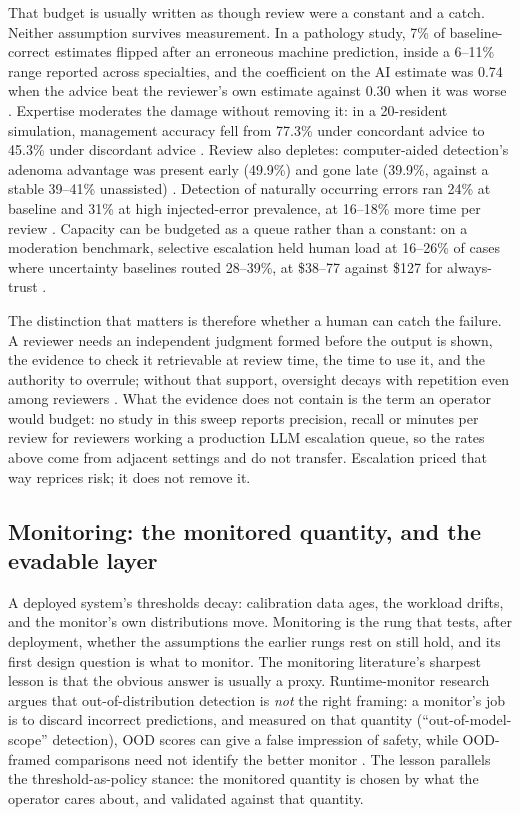 That budget is usually written as though review were a constant and a catch. Neither assumption
survives measurement. In a pathology study, 7\% of baseline-correct estimates flipped after an
erroneous machine prediction, inside a 6--11\% range reported across specialties, and the
coefficient on the AI estimate was 0.74 when the advice beat the reviewer's own estimate against
0.30 when it was worse \cite{rosbach2026stuck} \evindep{}. Expertise moderates the damage without
removing it: in a 20-resident simulation, management accuracy fell from 77.3\% under concordant
advice to 45.3\% under discordant advice \cite{atman2026llm} \evindep{}. Review also depletes: computer-aided
detection's adenoma advantage was present early (49.9\%) and gone late (39.9\%, against a stable
39--41\% unassisted) \cite{huang2026cade} \evindep{}. Detection of naturally occurring errors ran
24\% at baseline and 31\% at high injected-error prevalence, at 16--18\% more time per review
\cite{fang2026right} \evindep{}. Capacity can be budgeted as a queue rather than a
constant: on a moderation benchmark, selective escalation held human load at 16--26\% of cases
where uncertainty baselines routed 28--39\%, at \$38--77 against \$127 for always-trust
\cite{bachar2026lpp} \evaurep{}.

The distinction that matters is therefore whether a human can catch the failure. A reviewer
needs an independent judgment formed before the output is shown, the evidence to check it
retrievable at review time, the time to use it, and the authority to overrule; without that
support, oversight decays with repetition even among reviewers \cite{fu2026knowing} \evindep{}.
What the evidence does not contain is the term an operator would budget: no study in this sweep
reports precision, recall or minutes per review for reviewers working a production LLM
escalation queue, so the rates above come from adjacent settings and do not transfer. Escalation
priced that way reprices risk; it does not remove it.

\subsection{Monitoring: the monitored quantity, and the evadable layer}
\label{sec:l5-monitoring}

A deployed system's thresholds decay: calibration data ages, the workload drifts, and the
monitor's own distributions move. Monitoring is the rung that tests, after deployment, whether
the assumptions the earlier rungs rest on still hold, and its first design question is what to
monitor. The monitoring literature's sharpest lesson is that the obvious answer is usually a
proxy. Runtime-monitor research argues that out-of-distribution detection is \emph{not} the
right framing: a monitor's job is to discard incorrect predictions, and measured on that
quantity (``out-of-model-scope'' detection), OOD scores can give a false impression of safety,
while OOD-framed comparisons need not identify the better monitor \cite{id221116158} \evindep{}.
The lesson parallels the threshold-as-policy stance: the monitored quantity is chosen by what
the operator cares about, and validated against that quantity.

